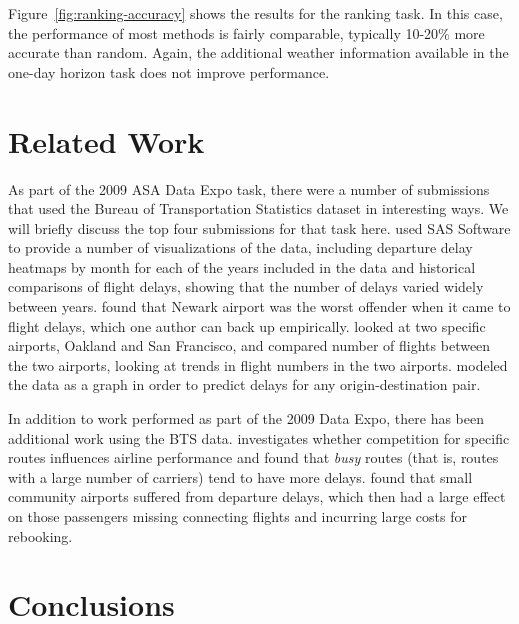 \documentclass[twocolumn]{article}
\begin{document}
Figure~\ref{fig:ranking-accuracy} shows the results for the ranking task. In this case, the performance of most methods is fairly comparable, typically 10-20\% more accurate than random. Again, the additional weather information available in the one-day horizon task does not improve performance.


\section{Related Work}

As part of the 2009 ASA Data Expo task, there were a number of submissions that used the Bureau of Transportation Statistics dataset in interesting ways. We will briefly discuss the top four submissions for that task here.
\cite{wicklin2009congestion} used SAS Software to provide a number of visualizations of the data, including departure delay heatmaps by month for each of the years included in the data and historical comparisons of flight delays, showing that the number of delays varied widely between years.
\cite{hofmann2011delayed} found that Newark airport was the worst offender when it came to flight delays, which one author can back up empirically.
\cite{wickham2011tale} looked at two specific airports, Oakland and San Francisco, and compared number of flights between the two airports, looking at trends in flight numbers in the two airports.
\cite{dey2009minimizing} modeled the data as a graph in order to predict delays for any origin-destination pair.

In addition to work performed as part of the 2009 Data Expo, there has been additional work using the BTS data.
\cite{rupp2006does} investigates whether competition for specific routes influences airline performance and found that \emph{busy} routes (that is, routes with a large number of carriers) tend to have more delays.
\cite{stone2015investigating} found that small community airports suffered from departure delays, which then had a large effect on those passengers missing connecting flights and incurring large costs for rebooking.

\section{Conclusions}





\end{document}
